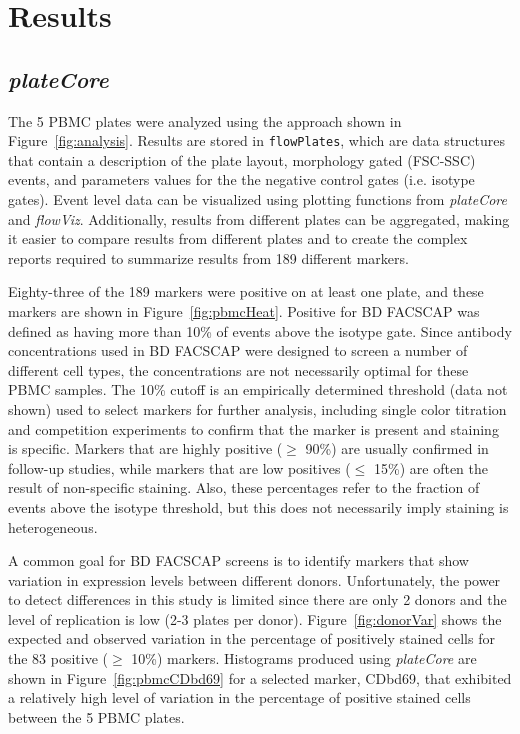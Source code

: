 \documentclass[12pt]{article}
\newcommand{\Robject}[1]{{\texttt{#1}}}
\newcommand{\Rpackage}[1]{{\textit{#1}}}
\begin{document}
\clearpage
\section*{Results}
\subsection*{\Rpackage{plateCore}}
The 5 PBMC plates were analyzed using the approach shown in Figure~\ref{fig:analysis}.  Results
are stored in \Robject{flowPlates}, which are data structures that contain a description of the
plate layout, morphology gated (FSC-SSC) events, and parameters values for the 
the negative control gates (i.e. isotype gates). Event level data can be 
visualized using plotting functions from \Rpackage{plateCore} and \Rpackage{flowViz}. 
Additionally, results from different plates can be aggregated, making it easier to compare
results from different plates and to create the complex reports required to summarize results from 
189 different markers.

Eighty-three of the 189 markers were positive on at least one plate, and these markers are 
shown in Figure~\ref{fig:pbmcHeat}. Positive for BD FACS\texttrademark CAP was defined as having more than 10\% of
events above the isotype gate. Since antibody concentrations used in BD FACS\texttrademark CAP were designed
to screen a number of different cell types, the concentrations are not necessarily optimal for these PBMC samples. 
The 10\% cutoff is an empirically determined threshold (data not shown) used to select markers for further analysis,
including single color titration and competition experiments to confirm that the marker is present
and staining is specific. Markers that are highly positive ($\ge$ 90\%) are usually confirmed in
follow-up studies, while markers that are low positives ($\le$ 15\%) are often the result of non-specific
staining. Also, these percentages refer to the fraction of events above the isotype threshold, but
this does not necessarily imply staining is heterogeneous.

A common goal for BD FACS\texttrademark CAP screens is to identify markers that show variation in expression levels
between different donors. Unfortunately, the power to detect differences in this study is limited since there are
only 2 donors and the level of replication is low (2-3 plates per donor). Figure~\ref{fig:donorVar} shows 
the expected and observed variation in the percentage of positively stained cells for the
83 positive ($\ge$ 10\%) markers. Histograms produced using \Rpackage{plateCore} are shown in Figure~\ref{fig:pbmcCDbd69}
for a selected marker, CDbd69, that exhibited a relatively high level of variation in the percentage of positive stained cells
between the 5 PBMC plates.
\end{document}
